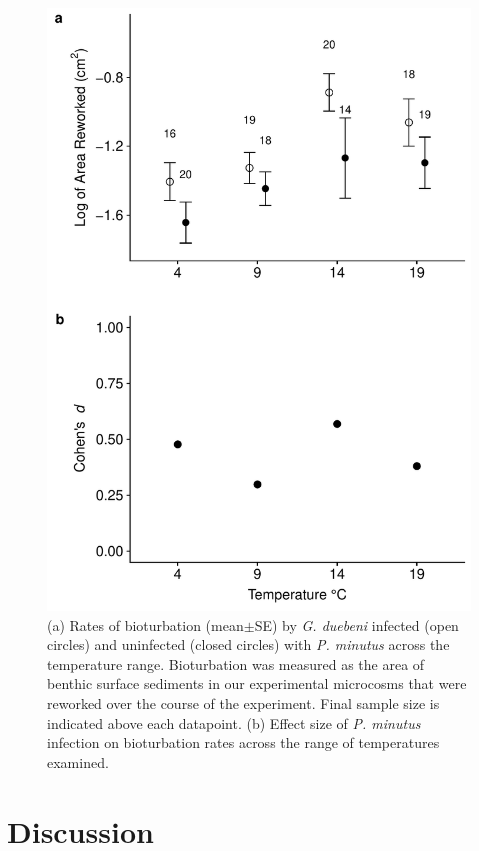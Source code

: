 \begin{figure}[H]
    \centering
    \includegraphics[keepaspectratio,width=\textwidth]{figures/ch3/bioturbnoctl.pdf}
  \caption [Surface sediment reworked by infected and uninfected gammarids across a broad temperature range.]{(a) Rates of bioturbation (mean$\pm$SE) by \emph{G. duebeni} infected (open circles) and uninfected (closed circles) with \emph{P. minutus} across the temperature range. Bioturbation was measured as the area of benthic surface sediments in our experimental microcosms that were reworked over the course of the experiment. Final sample size is indicated above each datapoint. (b) Effect size of \emph{P. minutus} infection on bioturbation rates across the range of temperatures examined.} 
    \label{fig:bioturbbox}
\end{figure}


\section{Discussion}

